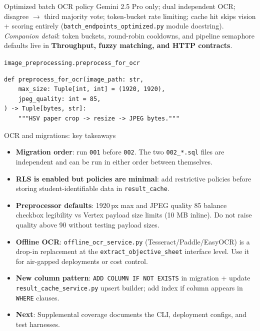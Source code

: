 \documentclass[aspectratio=169]{beamer}
\begin{document}
\begin{frame}{Optimized batch OCR policy}
  \small
  Gemini 2.5 Pro only; dual independent OCR; disagree $\rightarrow$ third majority vote; token-bucket rate limiting; cache hit skips vision + scoring entirely (\texttt{batch\_endpoints\_optimized.py} module docstring).\\
  \footnotesize \textit{Companion detail}: token buckets, round-robin cooldowns, and pipeline semaphore defaults live in \textbf{Throughput, fuzzy matching, and HTTP contracts}.
\end{frame}

\begin{frame}[fragile]{\texttt{image\_preprocessing.preprocess\_for\_ocr}}
\begin{lstlisting}[style=py]
def preprocess_for_ocr(image_path: str,
    max_size: Tuple[int, int] = (1920, 1920),
    jpeg_quality: int = 85,
) -> Tuple[bytes, str]:
    """HSV paper crop -> resize -> JPEG bytes."""
\end{lstlisting}
\end{frame}

\begin{frame}{OCR and migrations: key takeaways}
  \small
  \begin{itemize}\setlength\itemsep{0.3em}
    \item \textbf{Migration order}: run \texttt{001} before \texttt{002}. The two \texttt{002\_*.sql} files are independent and can be run in either order between themselves.
    \item \textbf{RLS is enabled but policies are minimal}: add restrictive policies before storing student-identifiable data in \texttt{result\_cache}.
    \item \textbf{Preprocessor defaults}: 1920\,px max and JPEG quality 85 balance checkbox legibility vs Vertex payload size limits (10 MB inline). Do not raise quality above 90 without testing payload sizes.
    \item \textbf{Offline OCR}: \texttt{offline\_ocr\_service.py} (Tesseract/Paddle/EasyOCR) is a drop-in replacement at the \texttt{extract\_objective\_sheet} interface level. Use it for air-gapped deployments or cost control.
    \item \textbf{New column pattern}: \texttt{ADD COLUMN IF NOT EXISTS} in migration + update \texttt{result\_cache\_service.py} upsert builder; add index if column appears in \texttt{WHERE} clauses.
    \item \textbf{Next}: Supplemental coverage documents the CLI, deployment configs, and test harnesses.
  \end{itemize}
\end{frame}
\end{document}
